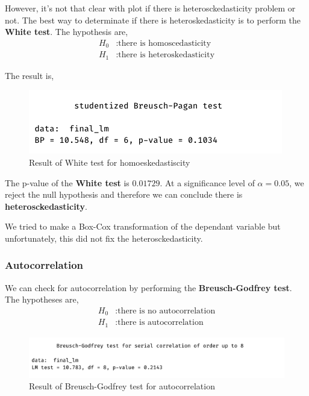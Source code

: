 However, it's not that clear with plot if there is heterosckedasticity problem or not. The best way to determinate if there is heteroskedasticity is to perform the \textbf{White test}. The hypothesis are,
\begin{align*}
	H_0&: \text{there is homoscedasticity} \\
	H_1&: \text{there is heteroskedasticity}
\end{align*}

The result is,
\begin{figure}[H]
	\centering
	\includegraphics{figures/models/white_test.png}
	\caption{Result of White test for homoeskedastiscity}
	\label{fig:white_test}
\end{figure}

The p-value of the \textbf{White test} is $0.01729$. At a significance level of $\alpha = 0.05$, we reject the null hypothesis and therefore we can conclude there is \textbf{heterosckedasticity}.


We tried to make a Box-Cox transformation of the dependant variable but unfortunately, this did not fix the heterosckedasticity.

\subsubsection{Autocorrelation}

We can check for autocorrelation by performing the \textbf{Breusch-Godfrey test}. The hypotheses are,
\begin{align*}
	H_0&: \text{there is no autocorrelation} \\
	H_1&: \text{there is autocorrelation}
\end{align*}

\begin{figure}[H]
	\centering
	\includegraphics{figures/models/Breusch-Godfrey_test.png}
	\caption{Result of Breusch-Godfrey test for autocorrelation}
	\label{fig:breusch-godfrey-test}
\end{figure}

